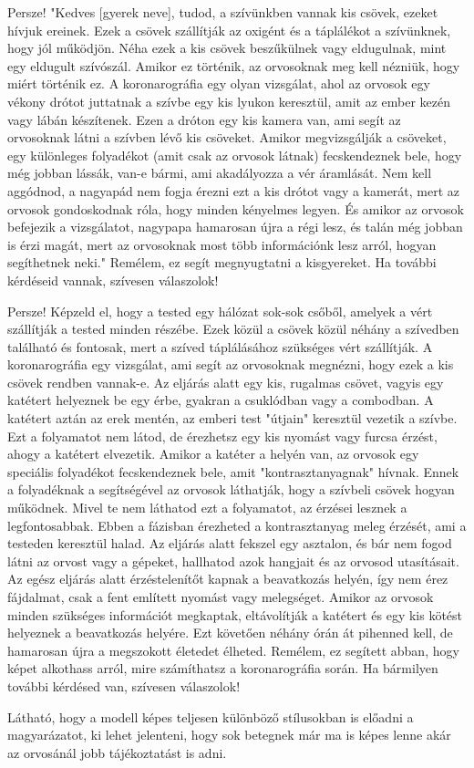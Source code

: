 \documentclass{article}
\begin{document}
\begin{multicols}{2}
Persze!
"Kedves [gyerek neve], tudod, a szívünkben vannak kis csövek, ezeket hívjuk ereinek. Ezek a csövek szállítják az oxigént és a táplálékot a szívünknek, hogy jól működjön. Néha ezek a kis csövek beszűkülnek vagy eldugulnak, mint egy eldugult szívószál. Amikor ez történik, az orvosoknak meg kell nézniük, hogy miért történik ez.
A koronarográfia egy olyan vizsgálat, ahol az orvosok egy vékony drótot juttatnak a szívbe egy kis lyukon keresztül, amit az ember kezén vagy lábán készítenek. Ezen a dróton egy kis kamera van, ami segít az orvosoknak látni a szívben lévő kis csöveket. Amikor megvizsgálják a csöveket, egy különleges folyadékot (amit csak az orvosok látnak) fecskendeznek bele, hogy még jobban lássák, van-e bármi, ami akadályozza a vér áramlását.
Nem kell aggódnod, a nagyapád nem fogja érezni ezt a kis drótot vagy a kamerát, mert az orvosok gondoskodnak róla, hogy minden kényelmes legyen. És amikor az orvosok befejezik a vizsgálatot, nagypapa hamarosan újra a régi lesz, és talán még jobban is érzi magát, mert az orvosoknak most több információnk lesz arról, hogyan segíthetnek neki."
Remélem, ez segít megnyugtatni a kisgyereket. Ha további kérdéseid vannak, szívesen válaszolok!



Persze!
Képzeld el, hogy a tested egy hálózat sok-sok csőből, amelyek a vért szállítják a tested minden részébe. Ezek közül a csövek közül néhány a szívedben található és fontosak, mert a szíved táplálásához szükséges vért szállítják. A koronarográfia egy vizsgálat, ami segít az orvosoknak megnézni, hogy ezek a kis csövek rendben vannak-e.
Az eljárás alatt egy kis, rugalmas csövet, vagyis egy katétert helyeznek be egy érbe, gyakran a csuklódban vagy a combodban. A katétert aztán az erek mentén, az emberi test "útjain" keresztül vezetik a szívbe. Ezt a folyamatot nem látod, de érezhetsz egy kis nyomást vagy furcsa érzést, ahogy a katétert elvezetik.
Amikor a katéter a helyén van, az orvosok egy speciális folyadékot fecskendeznek bele, amit "kontrasztanyagnak" hívnak. Ennek a folyadéknak a segítségével az orvosok láthatják, hogy a szívbeli csövek hogyan működnek. Mivel te nem láthatod ezt a folyamatot, az érzései lesznek a legfontosabbak. Ebben a fázisban érezheted a kontrasztanyag meleg érzését, ami a testeden keresztül halad.
Az eljárás alatt fekszel egy asztalon, és bár nem fogod látni az orvost vagy a gépeket, hallhatod azok hangjait és az orvosod utasításait. Az egész eljárás alatt érzéstelenítőt kapnak a beavatkozás helyén, így nem érez fájdalmat, csak a fent említett nyomást vagy melegséget.
Amikor az orvosok minden szükséges információt megkaptak, eltávolítják a katétert és egy kis kötést helyeznek a beavatkozás helyére. Ezt követően néhány órán át pihenned kell, de hamarosan újra a megszokott életedet élheted.
Remélem, ez segített abban, hogy képet alkothass arról, mire számíthatsz a koronarográfia során. Ha bármilyen további kérdésed van, szívesen válaszolok!

Látható, hogy a modell képes teljesen különböző stílusokban is előadni a magyarázatot, ki lehet jelenteni, hogy sok betegnek már ma is képes lenne akár az orvosánál jobb tájékoztatást is adni. 

\end{multicols}
\end{document}
